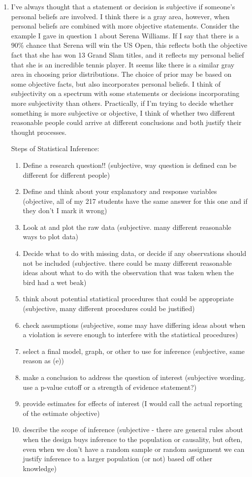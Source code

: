 \documentclass[12pt]{article}\usepackage[]{graphicx}\usepackage[]{color}
\begin{document}
\begin{doublespacing}
\begin{enumerate}
\item  I've always thought that a statement or decision is subjective if someone's personal beliefs are involved. I think there is a gray area, however, when personal beliefs are combined with more objective statements. Consider the example I gave in question $1$ about Serena Williams. If I say that there is a $90\%$ chance that Serena will win the US Open, this reflects both the objective fact that she has won 13 Grand Slam titles, and it reflects my personal belief that she is an incredible tennis player. It seems like there is a similar gray area in choosing prior distributions. The choice of prior may be based on some objective facts, but also incorporates personal beliefs. I think of subjectivity on a spectrum with some statements or decisions incorporating more subjectivity than others. Practically, if I'm trying to decide whether something is more subjective or objective, I think of whether two different reasonable people could arrive at different conclusions and both justify their thought processes.

Steps of Statistical Inference:
\begin{enumerate}
\item Define a research question!! (subjective, way question is defined can be different for different people)
\item Define and think about your explanatory and response variables (objective, all of my 217 students have the same answer for this one and if they don't I mark it wrong)
\item Look at and plot the raw data (subjective. many different reasonable ways to plot data)
\item Decide what to do with missing data, or decide if any observations should not be included (subjective. there could be many different reasonable ideas about what to do with the observation that was taken when the bird had a wet beak)
\item think about potential statistical procedures that could be appropriate (subjective, many different procedures could be justified)
\item check assumptions (subjective, some may have differing ideas about when a violation is severe enough to interfere with the statistical procedures)
\item select a final model, graph, or other to use for inference (subjective, same reason as (e))
\item make a conclusion to address the question of interest (subjective wording. use a p-value cutoff or a strength of evidence statement?)
\item provide estimates for effects of interest (I would call the actual reporting of the estimate objective)
\item describe the scope of inference (subjective - there are general rules about when the design buys inference to the population or causality, but often, even when we don't have a random sample or random assignment we can justify inference to a larger population (or not) based off other knowledge)
\end{enumerate}


\end{enumerate}
\end{doublespacing}
\end{document}
